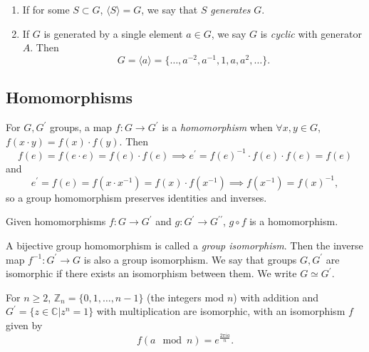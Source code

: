 \documentclass{article}
\begin{document}
\begin{defn}
  \begin{enumerate}
    \item{If for some $S \subset G$, $\langle S \rangle = G$, we say that
          $S$ \emph{generates} $G$.
         }
    \item{If $G$ is generated by a single element $a \in G$, we say $G$ is
          \emph{cyclic} with generator $A$. Then 
          $$
          G = \langle a \rangle = \{ \dots, a^{-2}, a^{-1}, 1, a, a^2, \dots \}.
          $$
         }
  \end{enumerate}
\end{defn}

\subsection{Homomorphisms}

\begin{defn}
For $G, G^\prime$ groups, a map $f : G \to G^\prime$ is a \emph{homomorphism}
when $\forall x, y \in G$, $f(x \cdot y) = f(x) \cdot f(y)$. Then
$$
f(e) = f(e \cdot e) = f(e) \cdot f(e) 
\implies e^\prime = f(e)^{-1} \cdot f(e) \cdot f(e) = f(e)
$$
and
$$
e^\prime = f(e) = f(x \cdot x^{-1}) = f(x) \cdot f(x^{-1})
\implies f(x^{-1}) = f(x)^{-1},
$$
so a group homomorphism preserves identities and inverses.
\end{defn}

\begin{prop}
Given homomorphisms $f : G \to G^\prime$ 
and $g : G^\prime \to G^{\prime\prime}$,
$g \circ f$ is a homomorphism.
\end{prop}

\begin{defn}
A bijective group homomorphism is called a \emph{group isomorphism}.
Then the inverse map $f^{-1} : G^\prime \to G$ is also a group isomorphism.
We say that groups $G, G^\prime$ are isomorphic if there exists an isomorphism
between them. We write $G \simeq G^\prime$.
\end{defn}

\begin{xmpl}
For $n \geq 2$, $\mathbb{Z}_n = \{ 0, 1, \dots, n-1 \}$ (the integers mod $n$)
with addition
and $G^\prime = \{ z \in \mathbb{C} | z^n = 1 \}$ with multiplication
are isomorphic, with an isomorphism $f$ given by
$$
f(a \mod n) = e^{\frac{2 \pi i a}{n}}.
$$
\end{xmpl}
\end{document}

